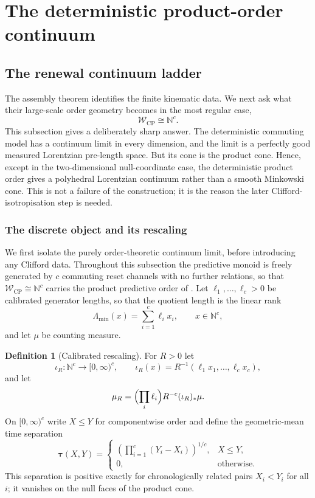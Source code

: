 \documentclass[11pt]{article}
\theoremstyle{definition}
\newtheorem{definition}[theorem]{Definition}
\theoremstyle{remark}
\newcommand{\N}{\mathbb{N}}
\newcommand{\W}{\mathcal{W}}
\newcommand{\CP}{\mathrm{CP}}
\newcommand{\Lam}{\Lambda}
\newcommand{\taug}{\boldsymbol{\tau}}
\begin{document}


\section{The deterministic product-order continuum}
\label{app:product-order}

\subsection{The renewal continuum ladder}
\label{sec:continuum}

The assembly theorem identifies the finite kinematic data.  We next ask what
their large-scale order geometry becomes in the most regular case,
\[
  \W_{\CP}\cong\N^c.
\]
This subsection gives a deliberately sharp answer.  The deterministic
commuting model has a continuum limit in every dimension, and the limit is a
perfectly good measured Lorentzian pre-length space.  But its cone is the
product cone.  Hence, except in the two-dimensional null-coordinate case, the
deterministic product order gives a polyhedral Lorentzian continuum rather than
a smooth Minkowski cone.  This is not a failure of the construction; it is the
reason the later Clifford-isotropisation step is needed.

\subsubsection{The discrete object and its rescaling}

We first isolate the purely order-theoretic continuum limit, before introducing
any Clifford data.  Throughout this subsection the predictive monoid is freely
generated by $c$ commuting reset channels with no further relations, so that
$\W_{\CP}\cong\N^c$ carries the product predictive order of
.  Let $\ell_1,\dots,\ell_c>0$ be calibrated
generator lengths, so that the quotient length is the linear rank
\[
  \Lam_{\min}(x)=\sum_{i=1}^c \ell_i x_i,\qquad x\in\N^c,
\]
and let $\mu$ be counting measure.

\begin{definition}[Calibrated rescaling]
\label{def:rescaling}
For $R>0$ let
\[
  \iota_R:\N^c\longrightarrow[0,\infty)^c,
  \qquad
  \iota_R(x)=R^{-1}(\ell_1x_1,\dots,\ell_cx_c),
\]
and let
\[
  \mu_R=\Bigl(\prod_i\ell_i\Bigr)R^{-c}(\iota_R)_*\mu.
\]
On $[0,\infty)^c$ write $X\le Y$ for componentwise order and define the geometric-mean time separation
\[
  \taug(X,Y)=
  \begin{cases}
  \left(\prod_{i=1}^c (Y_i-X_i)\right)^{1/c}, & X\le Y,\\[2pt]
  0, & \text{otherwise.}
  \end{cases}
\]
This separation is positive exactly for chronologically related pairs $X_i<Y_i$ for all $i$; it vanishes on the null faces of the product cone.
\end{definition}
\end{document}

